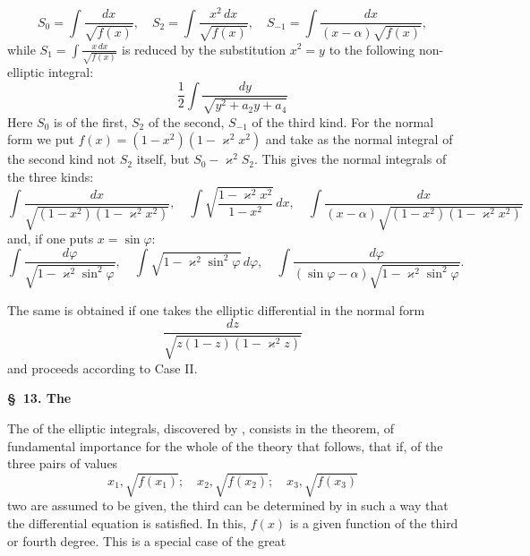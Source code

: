 \[
S_0 = \int \frac{dx}{\sqrt{f(x)}}, \quad S_2 = \int \frac{x^2\,dx}{\sqrt{f(x)}}, \quad S_{-1} = \int \frac{dx}{(x-\alpha)\sqrt{f(x)}},
\]
while $S_1 = \displaystyle\int \frac{x\,dx}{\sqrt{f(x)}}$ is reduced by the substitution $x^2 = y$ to the following non-elliptic integral:
\[
\frac{1}{2}\int \frac{dy}{\sqrt{y^2 + a_2 y + a_4}}
\]
Here $S_0$ is of the first, $S_2$ of the second, $S_{-1}$ of the third kind. For the  normal form we put $f(x) = (1-x^2)(1-\varkappa^2 x^2)$ and take as the normal integral of the second kind not $S_2$ itself, but $S_0 - \varkappa^2 S_2$. This gives the normal integrals of the three kinds:
\[
\int \frac{dx}{\sqrt{(1-x^2)(1-\varkappa^2 x^2)}}, \quad \int \sqrt{\frac{1-\varkappa^2 x^2}{1-x^2}}\,dx, \quad \int \frac{dx}{(x-\alpha)\sqrt{(1-x^2)(1-\varkappa^2 x^2)}}
\]
and, if one puts $x = \sin\varphi$:
\[
\int \frac{d\varphi}{\sqrt{1-\varkappa^2\sin^2\varphi}}, \quad \int \sqrt{1-\varkappa^2\sin^2\varphi}\,d\varphi, \quad \int \frac{d\varphi}{(\sin\varphi - \alpha)\sqrt{1-\varkappa^2\sin^2\varphi}}.
\]

The same is obtained if one takes the elliptic differential in the normal form
\[
\frac{dz}{\sqrt{z(1-z)(1-\varkappa^2 z)}}
\]
and proceeds according to Case II.

\begin{center}
\textbf{\S\ 13. The }
\end{center}

The  of the elliptic integrals, discovered by , consists in the theorem, of fundamental importance for the whole of the theory that follows, that if, of the three pairs of values
\[
x_1, \sqrt{f(x_1)}; \quad x_2, \sqrt{f(x_2)}; \quad x_3, \sqrt{f(x_3)}
\]
two are assumed to be given, the third can be determined by  in such a way that the differential equation
is satisfied. In this, $f(x)$ is a given function of the third or fourth degree. This is a special case of the great
